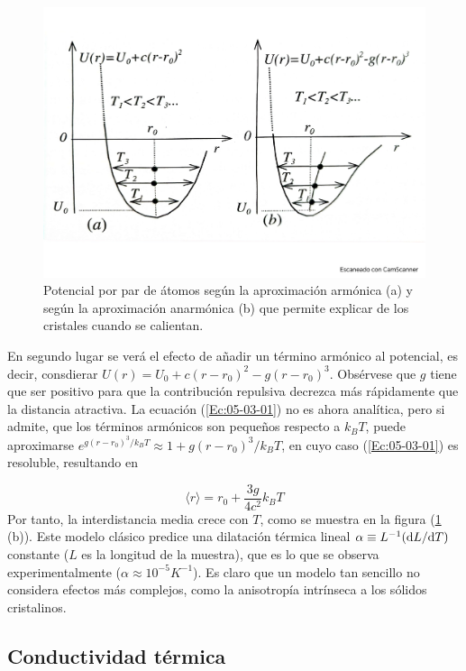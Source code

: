 \begin{figure}[h!] \centering
    \includegraphics[scale=0.37]{Cuerpo/Ch_05/Fotos libro 5.pdf}
    \caption{Potencial por par de átomos según la aproximación armónica (a) y según la aproximación anarmónica (b) que permite explicar de los cristales cuando se calientan.}
    \label{Fig:05-05}
\end{figure}    

En segundo lugar se verá el efecto de añadir un término armónico al potencial, es decir, consdierar $U(r) = U_0 + c(r-r_0)^2 - g(r-r_0)^3$. Obsérvese que $g$ tiene que ser positivo para que la contribución repulsiva decrezca más rápidamente que la distancia atractiva. La ecuación (\ref{Ec:05-03-01}) no es ahora analítica, pero si admite, que los términos armónicos son pequeños respecto a $k_BT$, puede aproximarse $e^{g(r-r_0)^3/k_BT} \approx 1 + g(r-r_0)^3 / k_BT$, en cuyo caso (\ref{Ec:05-03-01}) es resoluble, resultando en

\begin{equation}
    \langle r \rangle = r_0 + \frac{3g}{4c^2} k_B T
\end{equation}
Por tanto, la interdistancia media crece con $T$, como se muestra en la figura (\ref{Fig:05-05} (b)). Este modelo clásico predice una dilatación térmica lineal $\alpha \equiv L^{-1} (\mathrm{d} L / \mathrm{d} T)$ constante ($L$ es la longitud de la muestra), que es lo que se observa experimentalmente ($\alpha \approx 10^{-5} \unit{K^{-1}}$). Es claro que un modelo tan sencillo no considera efectos más complejos, como la anisotropía intrínseca a los sólidos cristalinos.

\subsection{Conductividad térmica}

